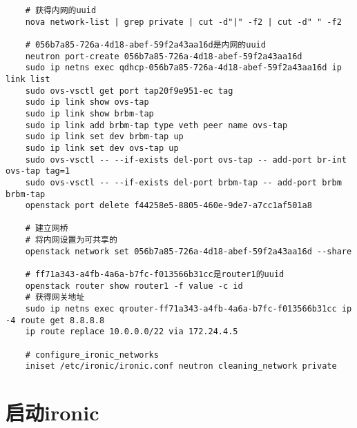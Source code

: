 \documentclass[a4paper,left=2.5cm,right=2.5cm,11pt]{article}
\begin{document}
	\begin{lstlisting}
	# 获得内网的uuid
	nova network-list | grep private | cut -d"|" -f2 | cut -d" " -f2

	# 056b7a85-726a-4d18-abef-59f2a43aa16d是内网的uuid
	neutron port-create 056b7a85-726a-4d18-abef-59f2a43aa16d
	sudo ip netns exec qdhcp-056b7a85-726a-4d18-abef-59f2a43aa16d ip link list
	sudo ovs-vsctl get port tap20f9e951-ec tag
	sudo ip link show ovs-tap
	sudo ip link show brbm-tap
	sudo ip link add brbm-tap type veth peer name ovs-tap
	sudo ip link set dev brbm-tap up
	sudo ip link set dev ovs-tap up
	sudo ovs-vsctl -- --if-exists del-port ovs-tap -- add-port br-int ovs-tap tag=1
	sudo ovs-vsctl -- --if-exists del-port brbm-tap -- add-port brbm brbm-tap
	openstack port delete f44258e5-8805-460e-9de7-a7cc1af501a8

	# 建立网桥
	# 将内网设置为可共享的
	openstack network set 056b7a85-726a-4d18-abef-59f2a43aa16d --share

	# ff71a343-a4fb-4a6a-b7fc-f013566b31cc是router1的uuid
	openstack router show router1 -f value -c id
	# 获得网关地址
	sudo ip netns exec qrouter-ff71a343-a4fb-4a6a-b7fc-f013566b31cc ip -4 route get 8.8.8.8
	ip route replace 10.0.0.0/22 via 172.24.4.5

	# configure_ironic_networks
	iniset /etc/ironic/ironic.conf neutron cleaning_network private
	\end{lstlisting}

\section{启动ironic}
\end{document}
